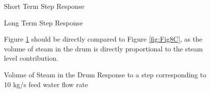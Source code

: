         \begin{figure}[ht]
            \begin{center}
               
                Short Term Step Response
                
                
                Long Term Step Response
                
                \caption{Volume of Steam in the Drum Response to a step corresponding to 10 kg/s feed water flow rate}
                \label{fig:Valve_Open2E}
            \end{center}
            Figure \ref{fig:Valve_Open2E} should be directly compared to Figure \ref{fig:Fig8C}, as the volume of steam in the drum is directly proportional to the steam level contribution. 
        \end{figure}  %
        
        

        \clearpage
        
